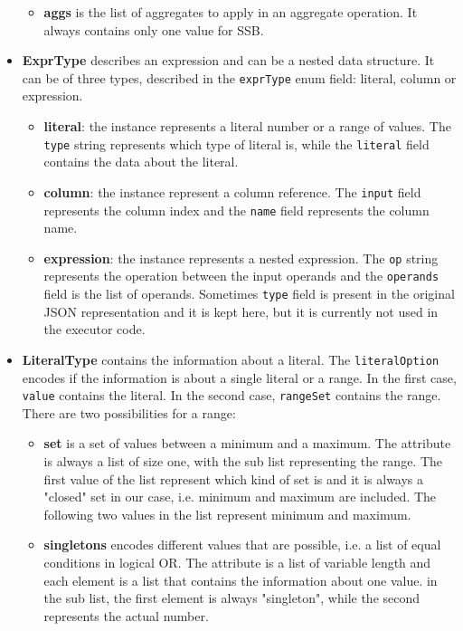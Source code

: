 \documentclass[a4paper, 10pt]{article}
\begin{document}
\begin{itemize}
\begin{itemize}
              \item \textbf{aggs} is the list of aggregates to apply in an aggregate operation. It always contains only one value for SSB.
          \end{itemize}
    \item \textbf{ExprType} describes an expression and can be a nested data structure. It can be of three types, described in the \texttt{exprType} enum field: literal, column or expression.
          \begin{itemize}
              \item \textbf{literal}: the instance represents a literal number or a range of values. The \texttt{type} string represents which type of literal is, while the \texttt{literal} field contains the data about the literal.
              \item \textbf{column}: the instance represent a column reference. The \texttt{input} field represents the column index and the \texttt{name} field represents the column name.
              \item \textbf{expression}: the instance represents a nested expression. The \texttt{op} string represents the operation between the input operands and the \texttt{operands} field is the list of operands. Sometimes \texttt{type} field is present in the original JSON representation and it is kept here, but it is currently not used in the executor code.
          \end{itemize}
    \item \textbf{LiteralType} contains the information about a literal. The \texttt{literalOption} encodes if the information is about a single literal or a range. In the first case, \texttt{value} contains the literal. In the second case, \texttt{rangeSet} contains the range. There are two possibilities for a range:
          \begin{itemize}
              \item \textbf{set} is a set of values between a minimum and a maximum. The attribute is always a list of size one, with the sub list representing the range. The first value of the list represent which kind of set is and it is always a "closed" set in our case, i.e. minimum and maximum are included. The following two values in the list represent minimum and maximum.
              \item \textbf{singletons} encodes different values that are possible, i.e. a list of equal conditions in logical OR. The attribute is a list of variable length and each element is a list that contains the information about one value. in the sub list, the first element is always "singleton", while the second represents the actual number.

\end{itemize}
\end{itemize}
\end{document}
